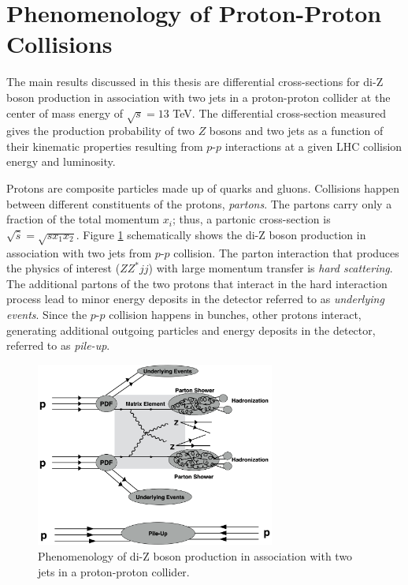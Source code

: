 \section{Phenomenology of Proton-Proton Collisions }    
\label{sec:Pheno}

The main results discussed in this thesis are differential cross-sections for di-Z boson production in association with two jets in a proton-proton collider at the center of mass energy of $\sqrt{s}=13$ TeV. The differential cross-section measured gives the production probability of two $Z$ bosons and two jets as a function of their kinematic properties resulting from $p$-$p$ interactions at a given LHC collision energy and luminosity.

Protons are composite particles made up of quarks and gluons. Collisions happen between different constituents of the protons, \textit{partons}. The partons carry only a fraction of the total momentum $x_{i}$; thus, a partonic cross-section is $\sqrt{\hat{s}} = \sqrt{sx_1x_2}$. Figure \ref{fig:ColliderPheno} schematically shows the di-Z boson production in association with two jets from $p$-$p$ collision. The parton interaction that produces the physics of interest ($ZZ^*jj$) with large momentum transfer is \textit{hard scattering}. The additional partons of the two protons that interact in the hard interaction process lead to minor energy deposits in the detector referred to as \textit{underlying events}. Since the $p$-$p$ collision happens in bunches, other protons interact, generating additional outgoing particles and energy deposits in the detector, referred to as \textit{pile-up}.

\begin{figure}[!htbp]
\centering
    \includegraphics[width=0.7\textwidth] {figures/Theory/ColliderPheno.pdf}\hspace{1cm}
    \caption{Phenomenology of di-Z boson production in association with two jets in a proton-proton collider.}
\label{fig:ColliderPheno}
\end{figure}


